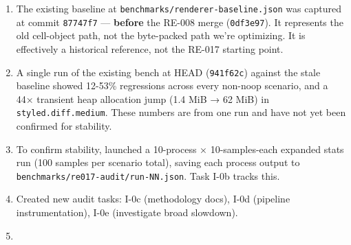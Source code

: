 \begin{enumerate}
\def\labelenumi{\arabic{enumi}.}
\tightlist
\item
  The existing baseline at \texttt{b\allowbreak{}e\allowbreak{}n\allowbreak{}c\allowbreak{}h\allowbreak{}m\allowbreak{}a\allowbreak{}r\allowbreak{}k\allowbreak{}s\allowbreak{}/\allowbreak{}r\allowbreak{}e\allowbreak{}n\allowbreak{}d\allowbreak{}e\allowbreak{}r\allowbreak{}e\allowbreak{}r\allowbreak{}-\allowbreak{}b\allowbreak{}a\allowbreak{}s\allowbreak{}e\allowbreak{}l\allowbreak{}i\allowbreak{}n\allowbreak{}e\allowbreak{}.\allowbreak{}j\allowbreak{}s\allowbreak{}o\allowbreak{}n} was captured at commit \texttt{8\allowbreak{}7\allowbreak{}7\allowbreak{}4\allowbreak{}7\allowbreak{}f\allowbreak{}7} --- \textbf{before} the RE-008 merge (\texttt{0\allowbreak{}d\allowbreak{}f\allowbreak{}3\allowbreak{}e\allowbreak{}9\allowbreak{}7}). It represents the old cell-object path, not the byte-packed path we're optimizing. It is effectively a historical reference, not the RE-017 starting point.
\item
  A single run of the existing bench at HEAD (\texttt{9\allowbreak{}4\allowbreak{}1\allowbreak{}f\allowbreak{}6\allowbreak{}2\allowbreak{}c}) against the stale baseline showed 12-53\% regressions across every non-noop scenario, and a 44× transient heap allocation jump (1.4 MiB → 62 MiB) in \texttt{s\allowbreak{}t\allowbreak{}y\allowbreak{}l\allowbreak{}e\allowbreak{}d\allowbreak{}.\allowbreak{}d\allowbreak{}i\allowbreak{}f\allowbreak{}f\allowbreak{}.\allowbreak{}m\allowbreak{}e\allowbreak{}d\allowbreak{}i\allowbreak{}u\allowbreak{}m}. These numbers are from one run and have not yet been confirmed for stability.
\item
  To confirm stability, launched a 10-process × 10-samples-each expanded stats run (100 samples per scenario total), saving each process output to \texttt{b\allowbreak{}e\allowbreak{}n\allowbreak{}c\allowbreak{}h\allowbreak{}m\allowbreak{}a\allowbreak{}r\allowbreak{}k\allowbreak{}s\allowbreak{}/\allowbreak{}r\allowbreak{}e\allowbreak{}0\allowbreak{}1\allowbreak{}7\allowbreak{}-\allowbreak{}a\allowbreak{}u\allowbreak{}d\allowbreak{}i\allowbreak{}t\allowbreak{}/\allowbreak{}r\allowbreak{}u\allowbreak{}n\allowbreak{}-\allowbreak{}N\allowbreak{}N\allowbreak{}.\allowbreak{}j\allowbreak{}s\allowbreak{}o\allowbreak{}n}. Task I-0b tracks this.
\item
  Created new audit tasks: I-0c (methodology docs), I-0d (pipeline instrumentation), I-0e (investigate broad slowdown).
\item

\end{enumerate}
